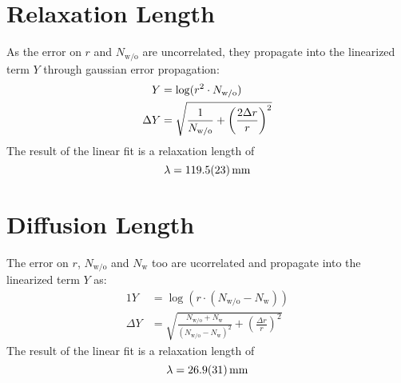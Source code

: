 \section{Relaxation Length}
As the error on $r$ and $N_\text{w/o}$ are uncorrelated, they propagate into the linearized term $Y$ through gaussian error propagation:
\begin{alignat}{1}
	Y &= \log(r^2 \cdot N_\text{w/o}) \nonumber\\
	\Delta Y &= \sqrt{
		\frac{1}{N_\text{w/o}} +
		\left(\frac{2 \Delta r}{r}\right)^2
	}
\end{alignat}
The result of the linear fit is a relaxation length of 
\begin{equation*}
	\lambda = \SI{119.5 +- 2.3}{\mm}
\end{equation*}

\section{Diffusion Length}
The error on $r$, $N_\text{w/o}$ and $N_\text{w}$ too are ucorrelated and propagate into the linearized term $Y$ as:
\begin{alignat}{1}
	Y &= \log(r \cdot (N_\text{w/o} - N_\text{w})) \nonumber\\
	\Delta Y &= \sqrt{
		\frac{N_\text{w/o} + N_\text{w}}{(N_\text{w/o} - N_\text{w})^2} +
		\left(\frac{\Delta r}{r}\right)^2
	}
\end{alignat}
The result of the linear fit is a relaxation length of 
\begin{equation*}
	\lambda = \SI{26.9 +- 3.1}{\mm}
\end{equation*}
